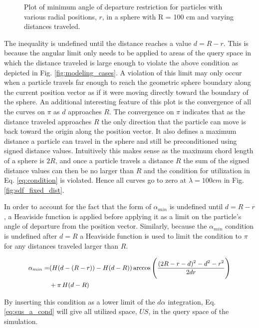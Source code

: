 \begin{figure}
\centering
{\textwidth}
\caption{Plot of minimum angle of departure restriction for particles with
various radial positions, $r$, in a sphere with R = 100 cm and varying distances traveled.}
\end{figure}

The inequality is undefined until the distance reaches a value $d = R- r$. This
is because the angular limit only needs to be applied to areas of the query
space in which the distance traveled is large enough to violate the above
condition as depicted in Fig. \ref{fig:modeling_cases}. A violation of this
limit may only occur when a particle travels far enough to reach the geometric
sphere boundary along the current position vector as if it were moving directly
toward the boundary of the sphere. An additional interesting feature of this
plot is the convergence of all the curves on $\pi$ as $d$ approaches $R$. The
convergence on $\pi$ indicates that as the distance traveled approaches $R$ the
only direction that the particle can move is back toward the origin along the
position vector. It also defines a maximum distance a particle can travel in the
sphere and still be preconditioned using signed distance values. Intuitively
this makes sense as the maximum chord length of a sphere is $2R$, and once a
particle travels a distance $R$ the sum of the signed distance values can then
be no larger than $R$ and the condition for utilization in Eq. \ref{eq:condition} is
violated. Hence all curves go to zero at $\lambda = 100 cm$ in
Fig. \ref{fig:sdf_fixed_dist}.

In order to account for the fact that the form of $\alpha_{min}$ is undefined
until $d = R-r$, a Heaviside function is applied before applying it as a limit
on the particle's angle of departure from the position vector. Similarly,
because the $\alpha_{min}$ condition is undefined after $d=R$ a Heaviside
function is used to limit the condition to $\pi$ for any distances traveled
larger than $R$.

\begin{equation}
  \small
  \begin{split}
  \alpha_{min} =& (H(d-(R-r))-H(d-R)) \arccos\Bigg ( \frac{(2R-r-d)^2-d^2-r^2}{2 d r} \Bigg ) \\
  &+ \pi \, H(d-R)
  \end{split}
\end{equation}


By inserting this condition as a lower limit of the $d\alpha$ integration,
Eq. \ref{eq:sus_a_cond} will give all utilized space, $US$, in the query space
of the simulation.

